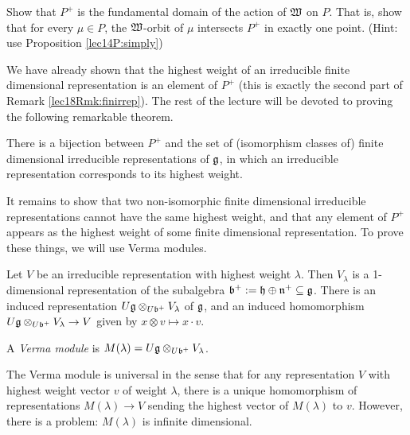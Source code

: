  \begin{exercise}
   Show that $P^+$ is the fundamental domain of the action of $\mathfrak{W}$ on $P$. That is,
   show that for every $\mu\in P$, the $\mathfrak{W}$-orbit of $\mu$ intersects $P^+$ in exactly
   one point. (Hint: use Proposition \ref{lec14P:simply})
   \begin{solution}
   \end{solution}
 \end{exercise}

 We have already shown that the highest weight of an irreducible finite dimensional
 representation is an element of $P^+$ (this is exactly the second part of Remark
 \ref{lec18Rmk:finirrep}). The rest of the lecture will be devoted to proving the
 following remarkable theorem.
 \begin{theorem}\label{lec18Thm:hiweight}
   There is a bijection between $P^+$ and the set of (isomorphism classes of)
   finite dimensional irreducible representations of $\mathfrak{g}$, in which an irreducible
   representation corresponds to its highest weight.
 \end{theorem}
 It remains to show that two non-isomorphic finite dimensional irreducible
 representations cannot have the same highest weight, and that any element of $P^+$
 appears as the highest weight of some finite dimensional representation. To prove
 these things, we will use Verma modules.

 Let $V$ be an irreducible representation with highest weight $\lambda$. Then
 $V_\lambda$ is a 1-dimensional representation of the subalgebra $\mathfrak{b}^+ :=\mathfrak{h}\oplus
 \mathfrak{n}^+\subseteq \mathfrak{g}$. There is an induced representation $U\mathfrak{g}\otimes_{U\mathfrak{b}^+}V_\lambda$
 of $\mathfrak{g}$, and an induced homomorphism $U\mathfrak{g}\otimes_{U\mathfrak{b}^+}V_\lambda\to V$ given by
 $x\otimes v\mapsto x\cdot v$.
 \begin{definition} 
   A \emph{Verma module} is $M(\lambda) = U\mathfrak{g}\otimes_{U\mathfrak{b}^+} V_\lambda$.
 \end{definition}
 The Verma module is universal in the sense that for any representation $V$ with highest
 weight vector $v$ of weight $\lambda$, there is a unique homomorphism of
 representations $M(\lambda)\to V$ sending the highest vector of $M(\lambda)$ to $v$.
 However, there is a problem: $M(\lambda)$ is infinite dimensional.

